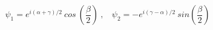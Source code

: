 \begin{equation}
\psi_1= e^{i(\alpha + \gamma)/2}~cos~(\frac{\beta}{2})~,~~~~\psi_2= - e^{i(\gamma-\alpha)/2}~sin(\frac{\beta}{2})
\end{equation}

